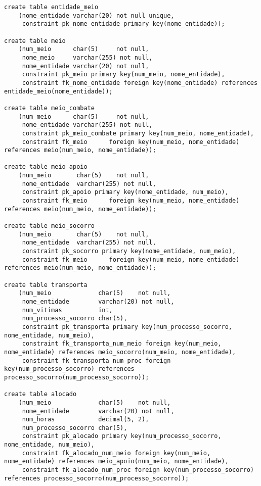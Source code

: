 \documentclass[12pt,a4paper]{article}
\begin{document}
\begin{verbatim}
create table entidade_meio
    (nome_entidade varchar(20) not null unique,
     constraint pk_nome_entidade primary key(nome_entidade));

create table meio
    (num_meio      char(5)     not null,
     nome_meio     varchar(255) not null,
     nome_entidade varchar(20) not null,
     constraint pk_meio primary key(num_meio, nome_entidade),
     constraint fk_nome_entidade foreign key(nome_entidade) references entidade_meio(nome_entidade));

create table meio_combate
    (num_meio      char(5)     not null,
     nome_entidade varchar(255) not null,
     constraint pk_meio_combate primary key(num_meio, nome_entidade),
     constraint fk_meio      foreign key(num_meio, nome_entidade)      references meio(num_meio, nome_entidade));

create table meio_apoio
    (num_meio       char(5)    not null,
     nome_entidade  varchar(255) not null,
     constraint pk_apoio primary key(nome_entidade, num_meio),
     constraint fk_meio      foreign key(num_meio, nome_entidade)      references meio(num_meio, nome_entidade));

create table meio_socorro
    (num_meio       char(5)    not null,
     nome_entidade  varchar(255) not null,
     constraint pk_socorro primary key(nome_entidade, num_meio),
     constraint fk_meio      foreign key(num_meio, nome_entidade)      references meio(num_meio, nome_entidade));

create table transporta
    (num_meio             char(5)    not null,
     nome_entidade        varchar(20) not null,
     num_vitimas          int,
     num_processo_socorro char(5),
     constraint pk_transporta primary key(num_processo_socorro, nome_entidade, num_meio),
     constraint fk_transporta_num_meio foreign key(num_meio, nome_entidade) references meio_socorro(num_meio, nome_entidade),
     constraint fk_transporta_num_proc foreign key(num_processo_socorro) references processo_socorro(num_processo_socorro));
    
create table alocado
    (num_meio             char(5)    not null,
     nome_entidade        varchar(20) not null,     
     num_horas            decimal(5, 2),
     num_processo_socorro char(5),
     constraint pk_alocado primary key(num_processo_socorro, nome_entidade, num_meio),
     constraint fk_alocado_num_meio foreign key(num_meio, nome_entidade) references meio_apoio(num_meio, nome_entidade),
     constraint fk_alocado_num_proc foreign key(num_processo_socorro) references processo_socorro(num_processo_socorro));


\end{verbatim}
\end{document}
